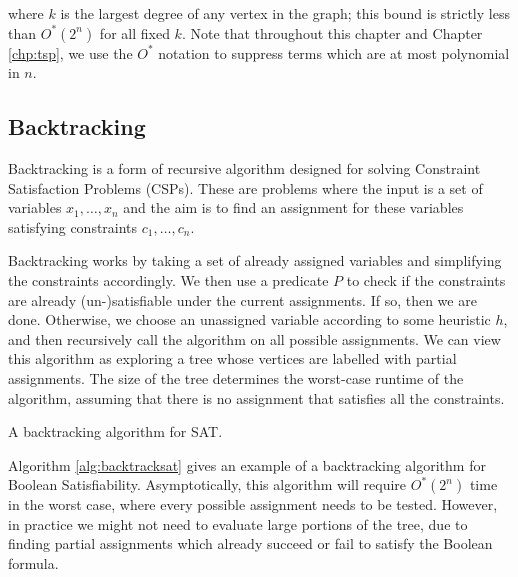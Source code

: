 \noindent where $k$ is the largest degree of any vertex in the graph; this bound is strictly less than $O^*(2^n)$ for all fixed $k$. Note that throughout this chapter and Chapter \ref{chp:tsp}, we use the $O^*$ notation to suppress terms which are at most polynomial in $n$.

\subsection{Backtracking}
\label{sec:backtrack}

Backtracking is a form of recursive algorithm designed for solving Constraint Satisfaction Problems (CSPs). These are problems where the input is a set of variables $x_1,\dots,x_n$ and the aim is to find an assignment for these variables satisfying constraints $c_1,\dots,c_n$.

Backtracking works by taking a set of already assigned variables and simplifying the constraints accordingly. We then use a predicate $P$ to check if the constraints are already (un-)satisfiable under the current assignments. If so, then we are done. Otherwise, we choose an unassigned variable according to some heuristic $h$, and then recursively call the algorithm on all possible assignments. We can view this algorithm as exploring a tree whose vertices are labelled with partial assignments. The size of the tree determines the worst-case runtime of the algorithm, assuming that there is no assignment that satisfies all the constraints.

\begin{algorithm}
\caption{\label{alg:backtracksat} A backtracking algorithm for SAT.}
\end{algorithm}

Algorithm \ref{alg:backtracksat} gives an example of a backtracking algorithm for Boolean Satisfiability. Asymptotically, this algorithm will require $O^*(2^n)$ time in the worst case, where every possible assignment needs to be tested. However, in practice we might not need to evaluate large portions of the tree, due to finding partial assignments which already succeed or fail to satisfy the Boolean formula.

